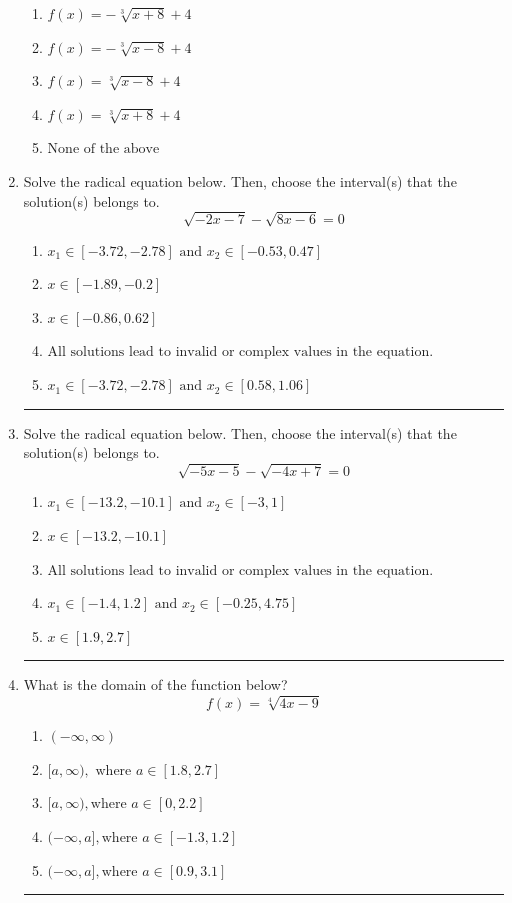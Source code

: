 \documentclass[14pt]{extbook}
\newcommand{\litem}[1]{\item#1\hspace*{-1cm}\rule{\textwidth}{0.4pt}}
\begin{document}
\begin{enumerate}
{\begin{center}
\end{center}
\begin{enumerate}[label=\Alph*.]
\item \( f(x) = - \sqrt[3]{x + 8} + 4 \)
\item \( f(x) = - \sqrt[3]{x - 8} + 4 \)
\item \( f(x) = \sqrt[3]{x - 8} + 4 \)
\item \( f(x) = \sqrt[3]{x + 8} + 4 \)
\item \( \text{None of the above} \)

\end{enumerate} }
\litem{
Solve the radical equation below. Then, choose the interval(s) that the solution(s) belongs to.\[ \sqrt{-2 x - 7} - \sqrt{8 x - 6} = 0 \]\begin{enumerate}[label=\Alph*.]
\item \( x_1 \in [-3.72, -2.78] \text{ and } x_2 \in [-0.53,0.47] \)
\item \( x \in [-1.89,-0.2] \)
\item \( x \in [-0.86,0.62] \)
\item \( \text{All solutions lead to invalid or complex values in the equation.} \)
\item \( x_1 \in [-3.72, -2.78] \text{ and } x_2 \in [0.58,1.06] \)

\end{enumerate} }
\litem{
Solve the radical equation below. Then, choose the interval(s) that the solution(s) belongs to.\[ \sqrt{-5 x - 5} - \sqrt{-4 x + 7} = 0 \]\begin{enumerate}[label=\Alph*.]
\item \( x_1 \in [-13.2, -10.1] \text{ and } x_2 \in [-3,1] \)
\item \( x \in [-13.2,-10.1] \)
\item \( \text{All solutions lead to invalid or complex values in the equation.} \)
\item \( x_1 \in [-1.4, 1.2] \text{ and } x_2 \in [-0.25,4.75] \)
\item \( x \in [1.9,2.7] \)

\end{enumerate} }
\litem{
What is the domain of the function below?\[ f(x) = \sqrt[4]{4 x - 9} \]\begin{enumerate}[label=\Alph*.]
\item \( (-\infty, \infty) \)
\item \( [a, \infty), \text{ where } a \in [1.8, 2.7] \)
\item \( [a, \infty), \text{where } a \in [0, 2.2] \)
\item \( (-\infty, a], \text{where } a \in [-1.3, 1.2] \)
\item \( (-\infty, a], \text{where } a \in [0.9, 3.1] \)


\end{enumerate}}
\end{enumerate}
\end{document}
